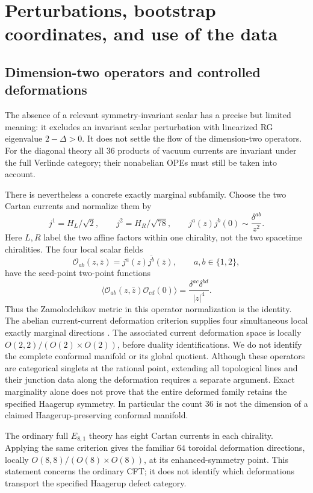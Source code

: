 \section{Perturbations, bootstrap coordinates, and use of the data}
\label{sec:physics-data-guide}

\subsection{Dimension-two operators and controlled deformations}

The absence of a relevant symmetry-invariant scalar has a precise but
limited meaning: it excludes an invariant scalar perturbation with
linearized RG eigenvalue $2-\Delta>0$. It does not settle the flow of
the dimension-two operators. For the diagonal theory all $36$ products
of vacuum currents are invariant under the full Verlinde category;
their nonabelian OPEs must still be taken into account.

There is nevertheless a concrete exactly marginal subfamily. Choose
the two Cartan currents and normalize them by
\[
 j^1=H_L/\sqrt2,\qquad j^2=H_R/\sqrt{78},\qquad
 j^a(z)j^b(0)\sim\frac{\delta^{ab}}{z^2}.
\]
Here $L,R$ label the two affine factors within one chirality, not the
two spacetime chiralities. The four local scalar fields
\begin{equation}\label{eq:physics-abelian-deformations}
 \mathcal O_{ab}(z,\bar z)=j^a(z)\overline{j^b}(\bar z),
 \qquad a,b\in\{1,2\},
\end{equation}
have the seed-point two-point functions
\[
 \langle\mathcal O_{ab}(z,\bar z)\mathcal O_{cd}(0)\rangle
 =\frac{\delta^{ac}\delta^{bd}}{|z|^4}.
\]
Thus the Zamolodchikov metric in this operator normalization is the
identity. The abelian current-current deformation criterion supplies
four simultaneous local exactly marginal directions
\cite[Section 2]{FR}. The associated current deformation space is locally
$O(2,2)/(O(2)\times O(2))$, before duality identifications. We do not
identify the complete conformal manifold or its global quotient.
Although these operators are categorical singlets at the rational
point, extending all topological lines and their junction data along
the deformation requires a separate argument. Exact marginality alone
does not prove that the entire deformed family retains the specified
Haagerup symmetry. In particular the count $36$ is not the dimension
of a claimed Haagerup-preserving conformal manifold.

The ordinary full $E_{8,1}$ theory has eight Cartan currents in each
chirality. Applying the same criterion gives the familiar $64$
toroidal deformation directions, locally
$O(8,8)/(O(8)\times O(8))$, at its enhanced-symmetry point. This
statement concerns the ordinary CFT; it does not identify which
deformations transport the specified Haagerup defect category.

